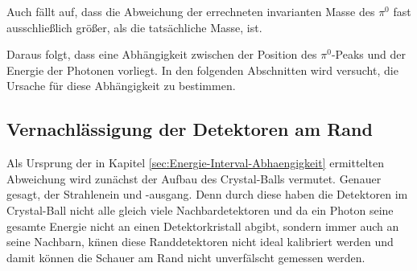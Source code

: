 \documentclass[a4paper,11pt,oneside,final,german,openbib,pdftex]{scrbook}
\begin{document}
{%

Auch fällt auf, dass die Abweichung der errechneten invarianten Masse des $\pi^0$ fast ausschließlich größer, als die tatsächliche Masse, ist.
  
Daraus folgt, dass eine Abhängigkeit zwischen der Position des $\pi^0$-Peaks und der Energie der Photonen vorliegt. In den folgenden Abschnitten wird versucht, die Ursache für diese Abhängigkeit zu bestimmen.





\subsection{Vernachl\"assigung der Detektoren am Rand}
\label{sec:Vernachlaessigung-der-Detektoren-am-Rand}

Als Ursprung der in Kapitel \ref{sec:Energie-Interval-Abhaengigkeit} ermittelten Abweichung wird zun\"achst der Aufbau des Crystal-Balls vermutet. Genauer gesagt, der Strahlenein und -ausgang. Denn durch diese haben die Detektoren im Crystal-Ball nicht alle gleich viele Nachbardetektoren und da ein Photon seine gesamte Energie nicht an einen Detektorkristall abgibt, sondern immer auch an seine Nachbarn, k\"nnen diese Randdetektoren nicht ideal kalibriert werden und damit k\"onnen die Schauer am Rand nicht unverf\"alscht gemessen werden. 


}
\end{document}
